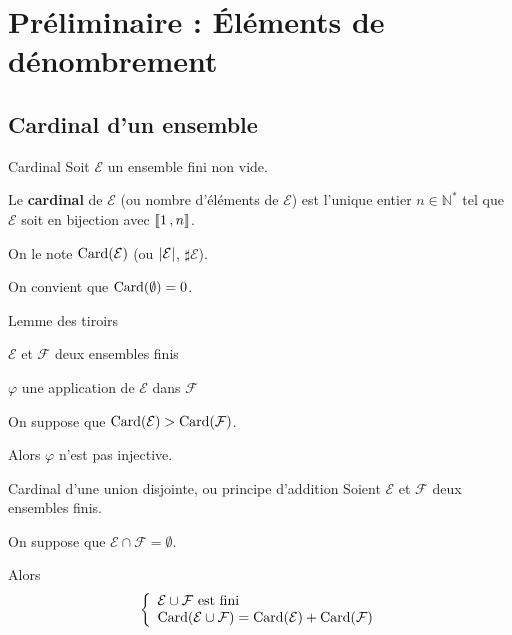 
\section{Préliminaire : Éléments de dénombrement}

    \subsection{Cardinal d’un ensemble}

    \begin{defi}{Cardinal}{}
        Soit $\mathcal{E}$ un ensemble fini non vide.

        Le \textbf{cardinal} de $\mathcal{E}$ (ou nombre d’éléments de $\mathcal{E}$) est l’unique entier $n \in \mathbb{N}^*$ tel que $\mathcal{E}$ soit en bijection avec $\left\llbracket 1 \, , n \right\rrbracket$. 

        On le note $\operatorname{Card}(\mathcal{E})$ (ou $\left\lvert \mathcal{E}\right\rvert$, $\sharp \mathcal{E}$). 

        On convient que $\operatorname{Card}(\emptyset) = 0$.
    \end{defi}

    \begin{lem}{Lemme des tiroirs}{}
        \begin{soient}
            \item $\mathcal{E}$ et $\mathcal{F}$ deux ensembles finis
            \item $\varphi$ une application de $\mathcal{E}$ dans $\mathcal{F}$
        \end{soient}
        On suppose que $\operatorname{Card}(\mathcal{E}) > \operatorname{Card}(\mathcal{F})$.

        Alors $\varphi$ n’est pas injective.
    \end{lem}

    \begin{prop}{Cardinal d’une union disjointe, ou principe d’addition}{}
        Soient $\mathcal{E}$ et $\mathcal{F}$ deux ensembles finis. 

        On suppose que $\mathcal{E} \cap \mathcal{F} = \emptyset$.

        Alors 
        \[ \et{\mathcal{E} \cup \mathcal{F} \text{ est fini}}{\card(\mathcal{E} \cup \mathcal{F}) = \card(\mathcal{E}) + \card(\mathcal{F})} \]
    \end{prop}


